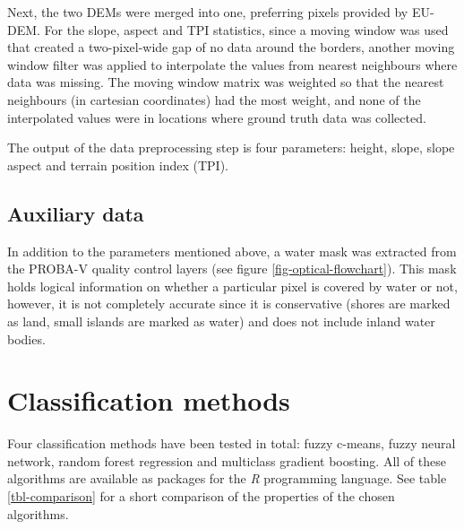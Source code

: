 \documentclass[a4paper,10pt]{book}
\begin{document}
Next, the two DEMs were merged into one, preferring pixels provided by EU-DEM. For the slope, aspect and TPI statistics, since a moving window was used that created a two-pixel-wide gap of no data around the borders, another moving window filter was applied to interpolate the values from nearest neighbours where data was missing. The moving window matrix was weighted so that the nearest neighbours (in cartesian coordinates) had the most weight, and none of the interpolated values were in locations where ground truth data was collected.

The output of the data preprocessing step is four parameters: height, slope, slope aspect and terrain position index (TPI).

\subsection{Auxiliary data}

In addition to the parameters mentioned above, a water mask was extracted from the PROBA-V quality control layers (see figure \ref{fig-optical-flowchart}). This mask holds logical information on whether a particular pixel is covered by water or not, however, it is not completely accurate since it is conservative (shores are marked as land, small islands are marked as water) and does not include inland water bodies.

\section{Classification methods}

Four classification methods have been tested in total: fuzzy c-means, fuzzy neural network, random forest regression and multiclass gradient boosting. All of these algorithms are available as packages for the \textit{R} programming language. See table \ref{tbl-comparison} for a short comparison of the properties of the chosen algorithms.

\begin{table}
  \begin{center}
  \end{center}
  \caption{Feature comparison between classification algorithms whose classification accuracy will be compared in the thesis. ``Partially fuzzy'' means the capability of training only on endmember pixels.}
  \label{tbl-comparison}
\end{table}
\end{document}
